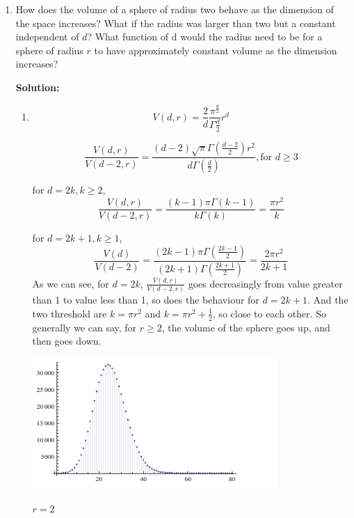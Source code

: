 \documentclass[a4paper, 12pt]{mcshw}
\begin{document}
    \begin{enumerate}
        \item 
        How does the volume of a sphere of radius two behave as the dimension of the space increases? What if the radius was larger than two but a constant independent of $d$? What function of d would the radius need to be for a sphere of radius $r$ to have approximately constant volume as the dimension increases?

        \textbf{Solution:} 
        \begin{enumerate}
            \item
            $$
            V(d,r)=\frac{2}{d}\frac{\pi^{\frac{d}{2}}}{\Gamma{\frac{d}{2}}}r^d
            $$

            \[
            \frac{V(d,r)}{V(d-2,r)}=\frac{(d-2)\sqrt{\pi}\Gamma(\frac{d-2}{2})r^2}{d\Gamma(\frac{d}{2})},\text{for } d \geq 3
            \]

            for $d = 2k, k \geq 2$,
            $$
            \frac{V(d,r)}{V(d-2,r)}=\frac{(k-1)\pi\Gamma(k-1)}{k\Gamma(k)}=\frac{\pi r^2}{k}
            $$

            for $d = 2k + 1, k \geq 1$,
            $$
            \frac{V(d)}{V(d-2)}=\frac{(2k-1)\pi\Gamma(\frac{2k-1}{2})}{(2k+1)\Gamma(\frac{2k+1}{2})}=\frac{2\pi{r}^2}{2k+1}
            $$
            As we can see, for $d=2k$, $\frac{V(d, r)}{V(d-2,r)}$ goes decreasingly from value greater than 1 to value less than 1, so does the behaviour for $d=2k+1$. And the two threshold are $k=\pi{r}^2$ and $k=\pi{r}^2+\frac{1}{2}$, so close to each other. So generally we can say, for $r \geq 2$, the volume of the sphere goes up, and then goes down.

            \begin{center}
                \includegraphics[height=5cm]{1.png}

                \vspace{-4mm}\scriptsize{$r=2$}
            \end{center}


\end{enumerate}
\end{enumerate}
\end{document}
